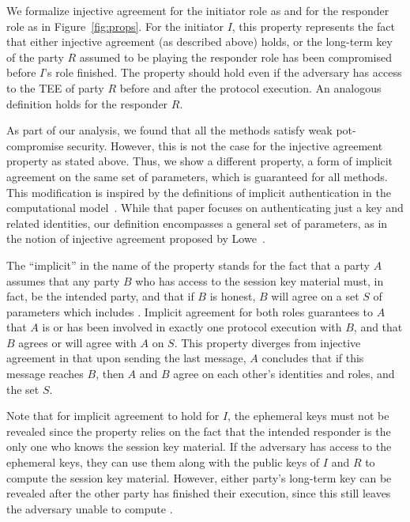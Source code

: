 %
We formalize injective agreement for the initiator role as \mPredInjI{} and
for the responder role as \mPredInjR{} in Figure~\ref{fig:props}.
%
For the initiator $I$, this property represents the fact that either
injective agreement (as described above) holds, or the long-term key of
the party $R$ assumed to be playing the responder role has been
compromised before $I$'s role finished.
%
The property should hold even if the adversary has access to the TEE of party $R$
before and after the protocol execution.
%
An analogous definition holds for the responder $R$.
%

As part of our analysis, we found that all the \mEdhoc{} methods satisfy weak
pot-compromise security.
%
However, this is not the case for the injective agreement property as stated 
above.
%
Thus, we show a different property, a form of implicit agreement on the same
set of parameters, which is guaranteed for all methods.
%
This modification is inspired by the definitions of implicit authentication in
the computational model~\cite{DBLP:conf/csfw/GuilhemFW20}.
%
While that paper focuses on authenticating just a key and related identities,
our definition encompasses a general set of parameters, as in the notion of
injective agreement proposed by Lowe~\cite{DBLP:conf/csfw/Lowe97a}.

The ``implicit'' in the name of the property stands for the fact that a party
$A$ assumes that any party $B$ who has access to the session key material
\mSessKey{} must, in fact, be the intended party, and that if $B$ is honest,
$B$ will agree on a set $S$ of parameters which includes \mSessKey.
%
Implicit agreement for both roles guarantees to $A$ that $A$ is or has been
involved in exactly one protocol execution with $B$, and that $B$ agrees or
will agree with $A$ on $S$.
%
This property diverges from injective agreement in that upon sending
the last message, $A$ concludes that if this message reaches $B$, then $A$
and $B$ agree on each other's identities and roles, and the set $S$.
%

Note that for implicit agreement to hold for $I$, the ephemeral keys must not
be revealed since the property relies on the fact that the intended responder
is the only one who knows the session key material.
%
If the adversary has access to the ephemeral keys, they can use them along 
with
the public keys of $I$ and $R$ to compute the session key material.
%
However, either party's long-term key can be revealed after the other
party has finished their execution, since this still leaves the adversary
unable to compute \mGxy{}.
%


